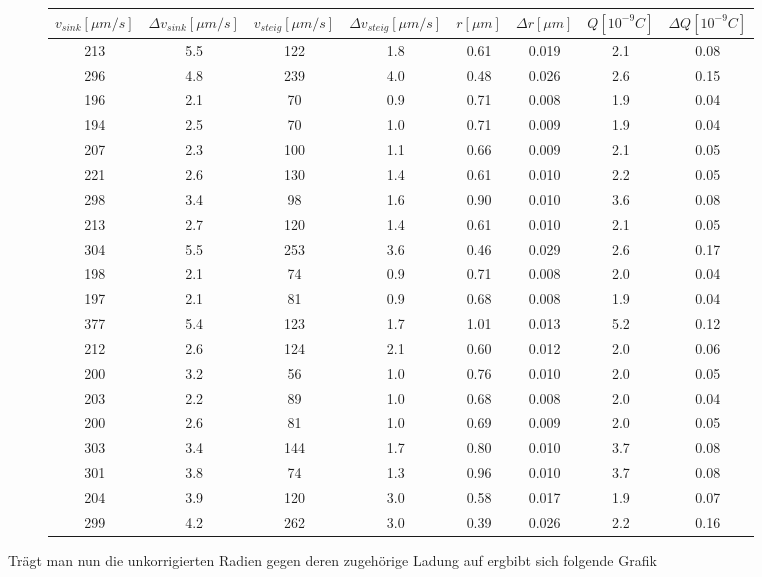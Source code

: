 \documentclass{scrartcl}
\begin{document}
	\begin{figure}[H]
		\begin{tabular}{c|c|c|c|c|c|c|c}
			\hline
			$v_{sink} [\mu m/s]$ & $\Delta v_{sink} [\mu m/s]$ & $v_{steig} [\mu m/s]$ &$\Delta v_{steig} [\mu m/s]$ & $r [\mu m] $&$ \Delta r [\mu m]$ &$ Q [10^{-9} C] $&$ \Delta Q [10^{-9} C]$\\
			\hline
			213 & 5.5 & 122 & 1.8 & 0.61 & 0.019 & 2.1 & 0.08\\
			296 & 4.8 & 239 & 4.0 & 0.48 & 0.026 & 2.6 & 0.15\\
			196 & 2.1 & 70 & 0.9 & 0.71 & 0.008 & 1.9 & 0.04\\
			194 & 2.5 & 70 & 1.0 & 0.71 & 0.009 & 1.9 & 0.04\\
			207 & 2.3 & 100 & 1.1 & 0.66 & 0.009 & 2.1 & 0.05\\
			221 & 2.6 & 130 & 1.4 & 0.61 & 0.010 & 2.2 & 0.05\\
			298 & 3.4 & 98 & 1.6 & 0.90 & 0.010 & 3.6 & 0.08\\
			213 & 2.7 & 120 & 1.4 & 0.61 & 0.010 & 2.1 & 0.05\\
			304 & 5.5 & 253 & 3.6 & 0.46 & 0.029 & 2.6 & 0.17\\
			198 & 2.1 & 74 & 0.9 & 0.71 & 0.008 & 2.0 & 0.04\\
			197 & 2.1 & 81 & 0.9 & 0.68 & 0.008 & 1.9 & 0.04\\
			377 & 5.4 & 123 & 1.7 & 1.01 & 0.013 & 5.2 & 0.12\\
			212 & 2.6 & 124 & 2.1 & 0.60 & 0.012 & 2.0 & 0.06\\
			200 & 3.2 & 56 & 1.0 & 0.76 & 0.010 & 2.0 & 0.05\\
			203 & 2.2 & 89 & 1.0 & 0.68 & 0.008 & 2.0 & 0.04\\
			200 & 2.6 & 81 & 1.0 & 0.69 & 0.009 & 2.0 & 0.05\\
			303 & 3.4 & 144 & 1.7 & 0.80 & 0.010 & 3.7 & 0.08\\
			301 & 3.8 & 74 & 1.3 & 0.96 & 0.010 & 3.7 & 0.08\\
			204 & 3.9 & 120 & 3.0 & 0.58 & 0.017 & 1.9 & 0.07\\
			299 & 4.2 & 262 & 3.0 & 0.39 & 0.026 & 2.2 & 0.16\\
		\end{tabular}
	\end{figure}
	Trägt man nun die unkorrigierten Radien gegen deren zugehörige Ladung auf ergbibt sich folgende Grafik
\end{document}
